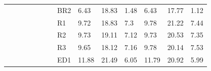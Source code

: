 {\begin{minipage}{\linewidth}
\begin{tabular}{l|l|l|l|c|c|r|l|lll|lll}
                                              &                                          &                                           &                                           &                                            &                                                                                         & \multicolumn{1}{c|}{}                                                                          & BR2                                       & 6.43  & 18.83 & 1.48      & 6.43  & 17.77 & 1.12       \\
                                              &                                          &                                           &                                           &                                            &                                                                                         & \multicolumn{1}{c|}{}                                                                          & R1                                        & 9.72  & 18.83 & 7.3       & 9.78  & 21.22 & 7.44       \\
                                              &                                          &                                           &                                           &                                            &                                                                                         & \multicolumn{1}{c|}{}                                                                          & R2                                        & 9.73  & 19.11 & 7.12      & 9.73  & 20.53 & 7.35       \\
                                              &                                          &                                           &                                           &                                            &                                                                                         & \multicolumn{1}{c|}{}                                                                          & R3                                        & 9.65  & 18.12 & 7.16      & 9.78  & 20.14 & 7.53       \\
                                              &                                          &                                           &                                           &                                            &                                                                                         & \multicolumn{1}{c|}{}                                                                          & ED1                                       & 11.88 & 21.49 & 6.05      & 11.79 & 20.92 & 5.99       \\

\end{tabular}
\end{minipage}}
